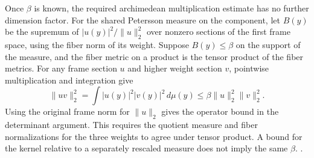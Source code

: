 








Once \(\beta\) is known, the required archimedean multiplication
estimate has no further dimension factor. For the shared Petersson
measure on the component, let \(B(y)\) be the supremum of
\(|u(y)|^2/\|u\|_2^2\) over nonzero sections of the first frame space,
using the fiber norm of its weight. Suppose \(B(y)\le\beta\) on the
support of the measure, and the fiber metric on a product is the
tensor product of the fiber metrics. For any frame section \(u\)
and higher weight section \(v\), pointwise multiplication and
integration give
\[
 \|uv\|_2^2=\int |u(y)|^2|v(y)|^2\,d\mu(y)
       \le \beta\|u\|_2^2\|v\|_2^2.
\]
Using the original frame norm for \(\|u\|_2\) gives the operator
bound in the determinant argument. This requires the quotient
measure and fiber normalizations for the three weights to agree
under tensor product. A bound for the kernel relative to a
separately rescaled measure does not imply the same \(\beta\).
.


